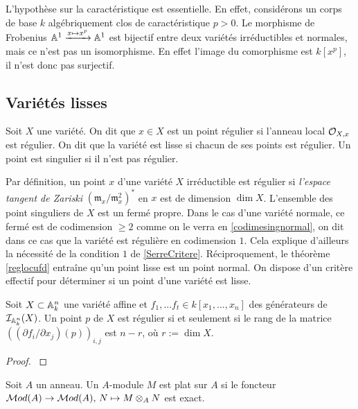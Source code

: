\begin{rem}
L'hypothèse sur la caractéristique est essentielle. En effet, considérons un corps de base $k$ algébriquement clos de caractéristique $p>0$. Le morphisme de Frobenius $\mathbb{A}^1 \xrightarrow{x \mapsto x^p} \mathbb{A}^1$  est bijectif entre deux variétés irréductibles et normales, mais ce n'est pas un isomorphisme. En effet l'image du comorphisme est $k[x^p]$, il n'est donc pas surjectif.
\end{rem}

\subsection{Variétés lisses}

\begin{defn}
Soit $X$ une variété. On dit que $x\in X$ est un point régulier si l'anneau local $\mathcal{O}_{X,x}$ est régulier. On dit que la variété est lisse si chacun de ses points est régulier. Un point est singulier si il n'est pas régulier.
\end{defn}

Par définition, un point $x$ d'une variété $X$ irréductible est régulier si \textit{l'espace tangent de Zariski} $(\mathfrak{m}_x/\mathfrak{m}_x^2)^*$ en $x$ est de dimension $\dim X$. L'ensemble des point singuliers de $X$ est un fermé propre. Dans le cas d'une variété normale, ce fermé est de codimension $\geq 2$ comme on le verra en \ref{codimesingnormal}, on dit dans ce cas que la variété est régulière en codimension $1$. Cela explique d'ailleurs la nécessité de la condition $1$ de \ref{SerreCritere}. Réciproquement, le théorème \ref{reglocufd} entraîne qu'un point lisse est un point normal. On dispose d'un critère effectif pour déterminer si un point d'une variété est lisse.

\begin{prop}\label{CritereReg}
Soit $X\subset \mathbb{A}^n_k$ une variété affine et $f_1,...f_t\in k[x_1,...,x_n]$ des générateurs de $\mathcal{I}_{\mathbb{A}^n_k}(X)$. Un point $p$ de $X$ est régulier si et seulement si le rang de la matrice $((\partial f_i/\partial x_j)(p))_{i,j}$ est $n-r$, où $r:=\dim X$.
\end{prop}
\begin{proof}
\cite[I.5.1]{Hartshorne} 
\end{proof}

\begin{defn}
Soit $A$ un anneau. Un  $A$-module $M$ est plat sur $A$ si le foncteur $\mathcal{M} od(A)\rightarrow \mathcal{M} od(A),\, N\mapsto M\otimes_A N$ est exact.
\end{defn}

